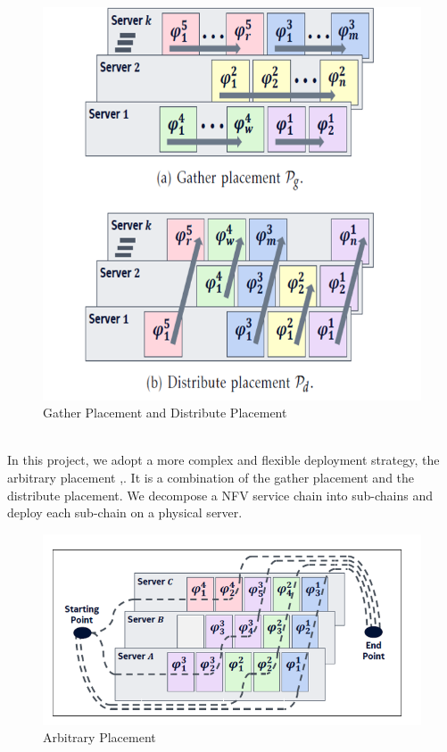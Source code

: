 \documentclass{acmtog}
\begin{document}
\begin{figure}[!h]
\centerline{\includegraphics[scale=0.38]{1.png}}
\caption{Gather Placement and Distribute Placement}
\label{fig: gather placement & distribute placement}
\end{figure}
\\\indent In this project, we adopt a more complex and flexible deployment strategy, the arbitrary placement \cite{c1},\cite{c2}. It is a combination of the gather placement and the distribute placement. We decompose a NFV service chain into sub-chains and deploy each sub-chain on a physical server.
\begin{figure}[!h]
\centerline{\includegraphics[scale=0.23]{2.png}}
\caption{Arbitrary Placement}
\label{fig: Arbitrary Placement}
\end{figure}
\end{document}
